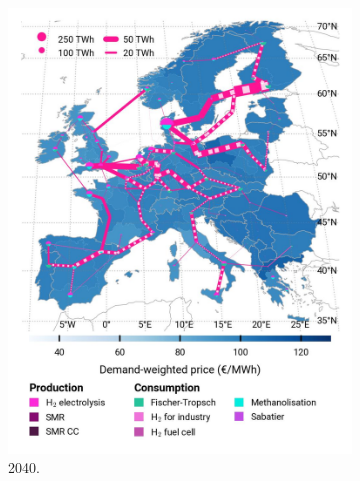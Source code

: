 \documentclass[preprint,12pt,sort&compress]{elsarticle}
\begin{document}
\begin{figure}[htbp]
\begin{subfigure}[t]{0.33\textwidth}
      \includegraphics[width=1\textwidth]{maps/pcipmi-national-international-expansion/base_s_adm___2040-balance_map_H2}
      \caption{ 2040.}
      \label{fig:PCI-in_lt_2040_h2}
  \end{subfigure}
  \begin{subfigure}[t]{0.33\textwidth}
    \vspace{0pt}

\end{subfigure}
\end{figure}
\end{document}
